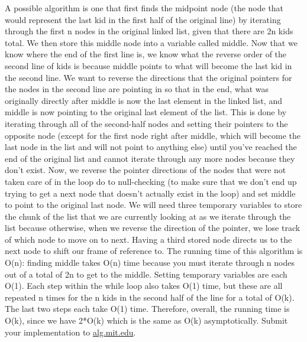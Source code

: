 \documentclass[12pt,twoside]{article}
\begin{document}
\begin{problems}
\begin{problemparts}
\problempart %
A possible algorithm is one that first finds the midpoint node (the node that would represent the last kid in the first half of the original line) by iterating through the first n nodes in the original linked list, given that there are 2n kids total. We then store this middle node into a variable called middle. Now that we know where the end of the first line is, we know what the reverse order of the second line of kids is because middle points to what will become the last kid in the second line. We want to reverse the directions that the original pointers for the nodes in the second line are pointing in so that in the end, what was originally directly after middle is now the last element in the linked list, and middle is now pointing to the original last element of the list. This is done by iterating through all of the second-half nodes and setting their pointers to the opposite node (except for the first node right after middle, which will become the last node in the list and will not point to anything else) until you’ve reached the end of the original list and cannot iterate through any more nodes because they don’t exist. Now, we reverse the pointer directions of the nodes that were not taken care of in the loop do to null-checking (to make sure that we don’t end up trying to get a next node that doesn’t actually exist in the loop) and set middle to point to the original last node. We will need three temporary variables to store the chunk of the list that we are currently looking at as we iterate through the list because otherwise, when we reverse the direction of the pointer, we lose track of which node to move on to next. Having a third stored node directs us to the next node to shift our frame of reference to. The running time of this algorithm is O(n): finding middle takes O(n) time because you must iterate through n nodes out of a total of 2n to get to the middle. Setting temporary variables are each O(1). Each step within the while loop also takes O(1) time, but these are all repeated n times for the n kids in the second half of the line for a total of O(k). The last two steps each take O(1) time. Therefore, overall, the running time is O(k), since we have 2*O(k) which is the same as O(k) asymptotically.
\problempart Submit your implementation to {\small\url{alg.mit.edu}}.
\end{problemparts}

\end{problems}
\end{document}
